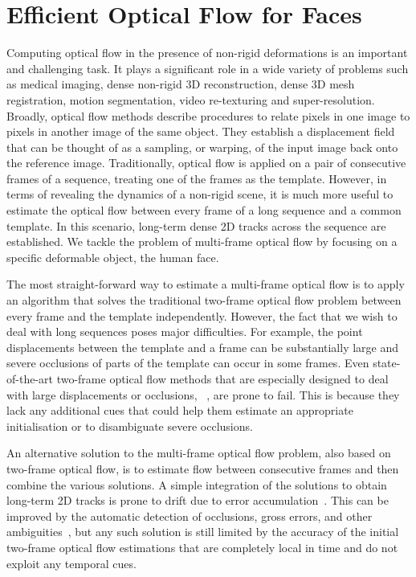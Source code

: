 \section{Efficient Optical Flow for Faces}\label{sec:face_flow_intro}
Computing optical flow in the presence of non-rigid deformations
is an important and challenging task. It plays a significant role in a wide variety of 
problems such as medical imaging, dense non-rigid 3D reconstruction, 
dense 3D mesh registration, motion segmentation, video re-texturing and super-resolution.
Broadly, optical flow methods describe procedures to relate pixels in
one image to pixels in another image of the same object. They establish a 
displacement field that can be thought of as a sampling, or warping, of the input 
image back onto the reference image. Traditionally, optical flow is applied on a pair 
of consecutive frames of a sequence, treating one of the frames as the template.
However, in terms of revealing the dynamics of a non-rigid scene, it is much more 
useful to estimate the optical flow between every frame of a long sequence and a 
common template. In this scenario, long-term dense 2D tracks across the sequence
are established. We tackle the problem of multi-frame optical flow by focusing on a 
specific deformable object, the human face.

The most straight-forward way to estimate a multi-frame optical flow is to apply an 
algorithm that solves the traditional two-frame optical flow problem between every 
frame and the template independently.
However, the fact that we wish to deal with long sequences poses major difficulties. 
For example, the point displacements between the template and a frame can be substantially 
large and severe occlusions of parts of the template can occur in some frames. Even 
state-of-the-art two-frame optical flow methods that are especially designed to deal 
with large displacements or occlusions, \eg~\cite{brox2011large,revaud2015epicflow}, 
are  prone to fail. This is because they lack any additional cues that could help
them estimate an appropriate initialisation or to disambiguate severe occlusions.

An alternative solution to the multi-frame optical flow problem, also based on 
two-frame optical flow, is to estimate flow between consecutive frames and then 
combine the various solutions. A simple integration of the solutions to obtain long-term 
2D tracks is prone to drift due to error accumulation~\cite{cosker2011facs,brox2011large}.
This can be improved by the automatic detection of occlusions, gross errors, 
and other ambiguities~\cite{sand2008particle,sundaram2010dense,%
rubinstein2012towards,ricco2012simultaneous,papamakarios2011generalised}, 
but any such solution is still limited by the accuracy of the initial two-frame
optical  flow estimations that are completely local in time and do not exploit
any temporal cues.

